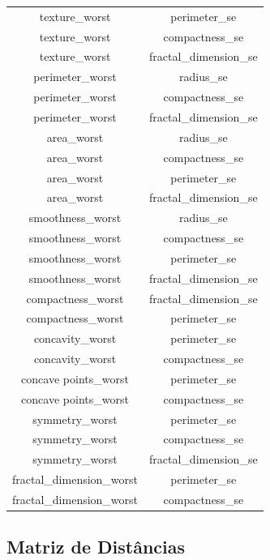 \documentclass[11pt,a4paper]{article}
\numberwithin{equation}{section}
\begin{document}
\begin{table}[H]
\begin{tabular}{c|c}
texture\_worst            & perimeter\_se          \\
texture\_worst            & compactness\_se        \\
texture\_worst            & fractal\_dimension\_se \\
perimeter\_worst          & radius\_se             \\
perimeter\_worst          & compactness\_se        \\
perimeter\_worst          & fractal\_dimension\_se \\
area\_worst               & radius\_se             \\
area\_worst               & compactness\_se        \\
area\_worst               & perimeter\_se          \\
area\_worst               & fractal\_dimension\_se \\
smoothness\_worst         & radius\_se             \\
smoothness\_worst         & compactness\_se        \\
smoothness\_worst         & perimeter\_se          \\
smoothness\_worst         & fractal\_dimension\_se \\
compactness\_worst        & fractal\_dimension\_se \\
compactness\_worst        & perimeter\_se          \\
concavity\_worst          & perimeter\_se          \\
concavity\_worst          & compactness\_se        \\
concave points\_worst     & perimeter\_se          \\
concave points\_worst     & compactness\_se        \\
symmetry\_worst           & perimeter\_se          \\
symmetry\_worst           & compactness\_se        \\
symmetry\_worst           & fractal\_dimension\_se \\
fractal\_dimension\_worst & perimeter\_se          \\
fractal\_dimension\_worst & compactness\_se       
\end{tabular}
\end{table}
\subsection{Matriz de Distâncias} 
\end{document}
